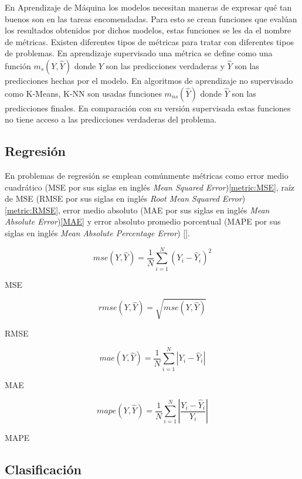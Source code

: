 En Aprendizaje de Máquina los modelos necesitan maneras de expresar qué tan buenos son 
en las tareas encomendadas. Para esto se crean funciones que evalúan los resultados obtenidos
por dichos modelos, estas funciones se les da el nombre de métricas. Existen diferentes tipos de
métricas para tratar con diferentes tipos de problemas. En aprendizaje supervisado una métrica se
define como una función $m_s(Y, \hat{Y})$ donde $Y$ son las predicciones verdaderas y $\hat{Y}$ son las predicciones
hechas por el modelo. En algoritmos de aprendizaje no supervisado como K-Means, K-NN son usadas funciones $m_{ns}(\hat{Y})$
donde $\hat{Y}$ son las predicciones finales. En comparación con su versión supervisada estas funciones no tiene acceso
a las predicciones verdaderas del problema.

\subsection{Regresión}

En problemas de regresión se emplean comúnmente
métricas como error medio cuadrático (MSE por sus siglas en inglés \emph{Mean Squared Error})\ref{metric:MSE}, 
raíz de MSE (RMSE por sus siglas en inglés \emph{Root Mean Squared Error})\ref{metric:RMSE},
error medio absoluto (MAE por sus siglas en inglés \emph{Mean Absolute Error})\ref{MAE} y error absoluto promedio porcentual 
(MAPE por sus siglas en inglés \emph{Mean Absolute Percentage Error}) [\cite{botchkarev2019new}].

\begin{equation}\label{metric:MSE}
	mse(Y, \hat{Y}) = \frac{1}{N} \sum^{N}_{i=1} (Y_i - \hat{Y}_i)^2
\end{equation}\caption{MSE}

\begin{equation}\label{metric:RMSE}
	rmse(Y, \hat{Y}) = \sqrt{mse(Y, \hat{Y})}
\end{equation}\caption{RMSE}

\begin{equation}\label{metric:MAE}
	mae(Y, \hat{Y}) = \frac{1}{N} \sum^{N}_{i=1} |Y_i - \hat{Y}_i|
\end{equation}\caption{MAE}

\begin{equation}\label{metric:MAPE}
	mape(Y, \hat{Y}) = \frac{1}{N} \sum^{N}_{i=1} |\frac{Y_i - \hat{Y}_i}{Y_i}|
\end{equation}\caption{MAPE}

\subsection{Clasificación}

